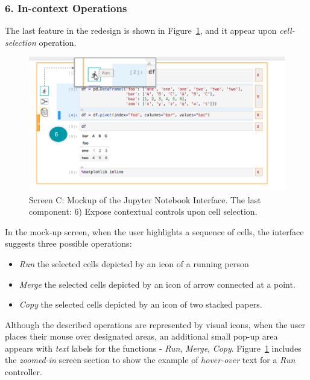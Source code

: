 \documentclass[12pt,letterpaper]{article}
\begin{document}
\subsubsection*{6. In-context Operations}
The last feature in the redesign is shown in Figure~\ref{fig::6}, and it appear upon \textit{cell-selection} operation. 

\begin{figure}[hbt!]
\centering
\includegraphics[scale=.4]{figures/project-principles/jupyter_mock_screen_c.png}
\caption{Screen C: Mockup of the Jupyter Notebook Interface. The last component: 6) Expose contextual controls upon cell selection.}
\label{fig::6}
\end{figure}

In the mock-up screen, when the user highlights a sequence of cells, the interface suggests three possible operations:

\begin{itemize}
\itemsep0em 
    \item \textit{Run} the selected cells depicted by an icon of a running person
    \item \textit{Merge} the selected cells depicted by an icon of arrow connected at a point.
    \item \textit{Copy} the selected cells depicted by an icon of two stacked papers.
\end{itemize}

Although the described operations are represented by visual icons, when the user places their mouse over designated areas, an additional small pop-up area appears with \textit{text} labels for the functions - \textit{Run}, \textit{Merge}, \textit{Copy}. Figure~\ref{fig::6} includes the \textit{zoomed-in} screen section to show the example of \textit{hover-over} text for a \textit{Run} controller.
\end{document}
